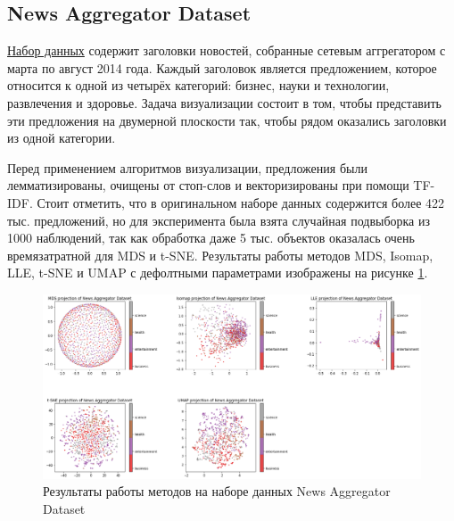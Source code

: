 \documentclass[10pt, a4paper]{extarticle}
\begin{document}
\subsection{News Aggregator Dataset}

\href{https://www.kaggle.com/uciml/news-aggregator-dataset}{Набор данных} содержит заголовки новостей, собранные сетевым аггрегатором с марта по август 2014 года. 
Каждый заголовок является предложением, которое относится к одной из четырёх категорий: бизнес, науки и технологии, развлечения и здоровье. Задача визуализации состоит в том, чтобы представить эти предложения на двумерной плоскости так, чтобы рядом оказались заголовки из одной категории.

Перед применением алгоритмов визуализации, предложения были лемматизированы, очищены от стоп-слов и векторизированы при помощи TF-IDF. Стоит отметить, что в оригинальном наборе данных содержится более 422 тыс. предложений, но для эксперимента была взята случайная подвыборка из 1000 наблюдений, так как обработка даже 5 тыс. объектов оказалась очень времязатратной для MDS и t-SNE.
Результаты работы методов MDS, Isomap, LLE, t-SNE и UMAP с дефолтными параметрами изображены на рисунке \ref{fig:resutls_news}.
\begin{figure}[h!]
    \vspace{1em}
    \centering
    \includegraphics[width=\linewidth]{news_methods.png}
    \caption{Результаты работы методов на наборе данных News Aggregator Dataset}
    \label{fig:resutls_news}
\end{figure}
\end{document}
